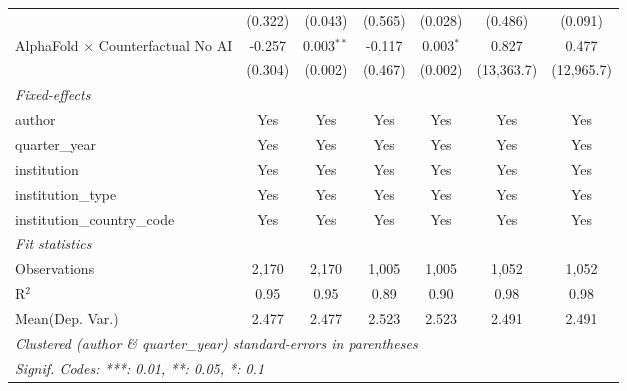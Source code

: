 \begin{tabular}{lcccccc}
                                            & (0.322) & (0.043)        & (0.565) & (0.028)       & (0.486)    & (0.091)\\   
   AlphaFold $\times$ Counterfactual No AI  & -0.257  & 0.003$^{**}$   & -0.117  & 0.003$^{*}$   & 0.827      & 0.477\\   
                                            & (0.304) & (0.002)        & (0.467) & (0.002)       & (13,363.7) & (12,965.7)\\   
   \midrule
   \emph{Fixed-effects}\\
   author                                   & Yes     & Yes            & Yes     & Yes           & Yes        & Yes\\  
   quarter\_year                            & Yes     & Yes            & Yes     & Yes           & Yes        & Yes\\  
   institution                              & Yes     & Yes            & Yes     & Yes           & Yes        & Yes\\  
   institution\_type                        & Yes     & Yes            & Yes     & Yes           & Yes        & Yes\\  
   institution\_country\_code               & Yes     & Yes            & Yes     & Yes           & Yes        & Yes\\  
   \midrule
   \emph{Fit statistics}\\
   Observations                             & 2,170   & 2,170          & 1,005   & 1,005         & 1,052      & 1,052\\  
   R$^2$                                    & 0.95    & 0.95           & 0.89    & 0.90          & 0.98       & 0.98\\  
Mean(Dep. Var.) & 2.477 & 2.477 & 2.523 & 2.523 & 2.491 & 2.491 \\
   \midrule \midrule
   \multicolumn{7}{l}{\emph{Clustered (author \& quarter\_year) standard-errors in parentheses}}\\
   \multicolumn{7}{l}{\emph{Signif. Codes: ***: 0.01, **: 0.05, *: 0.1}}\\
\end{tabular}
\par\endgroup
